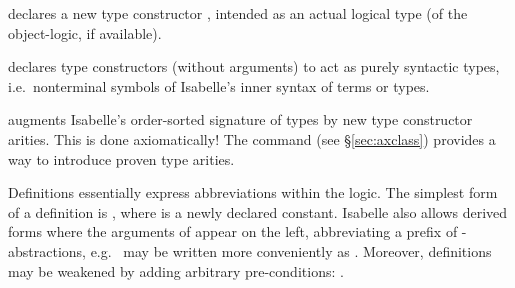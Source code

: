 \begin{isabellebody}
\begin{isamarkuptext}
\begin{descr}
  \item [\hyperlink{command.typedecl}{\mbox{\isa{\isacommand{typedecl}}}}~\isa{{\isachardoublequote}{\isacharparenleft}{\isasymalpha}\isactrlsub {\isadigit{1}}{\isacharcomma}\ {\isasymdots}{\isacharcomma}\ {\isasymalpha}\isactrlsub n{\isacharparenright}\ t{\isachardoublequote}}]
  declares a new type constructor , intended as an actual
  logical type (of the object-logic, if available).

  \item [\hyperlink{command.nonterminals}{\mbox{\isa{\isacommand{nonterminals}}}}~\isa{c}] declares type
  constructors  (without arguments) to act as purely
  syntactic types, i.e.\ nonterminal symbols of Isabelle's inner
  syntax of terms or types.

  \item [\hyperlink{command.arities}{\mbox{\isa{\isacommand{arities}}}}~\isa{{\isachardoublequote}t\ {\isacharcolon}{\isacharcolon}\ {\isacharparenleft}s\isactrlsub {\isadigit{1}}{\isacharcomma}\ {\isasymdots}{\isacharcomma}\ s\isactrlsub n{\isacharparenright}\ s{\isachardoublequote}}] augments Isabelle's order-sorted signature of types by new type
  constructor arities.  This is done axiomatically!  The \hyperlink{command.instance}{\mbox{}} command (see \S\ref{sec:axclass}) provides a way to
  introduce proven type arities.

  \end{descr}%
\end{isamarkuptext}%
\isamarkuptrue%
%
\isamarkuptrue%
%
\begin{isamarkuptext}%
Definitions essentially express abbreviations within the logic.  The
  simplest form of a definition is , where  is a newly declared constant.  Isabelle also allows derived forms
  where the arguments of  appear on the left, abbreviating a
  prefix of \isa{{\isasymlambda}}-abstractions, e.g.\  may be
  written more conveniently as .  Moreover,
  definitions may be weakened by adding arbitrary pre-conditions:
  .


\end{isamarkuptext}
\end{isabellebody}
